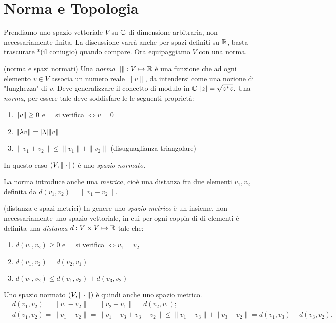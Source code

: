 \chapter{Norma e Topologia}
Prendiamo uno spazio vettoriale $V$ su $\mathbb C$ di dimensione arbitraria, non
necessariamente finita. La discussione varrà anche per spazi definiti su
$\mathbb R$, basta trascurare *(il coniugio) quando compare. Ora equipaggiamo $V$
con una norma.
\begin{definition}{(norma e spazi normati)}
Una \emph{norma} $\| \|: V \mapsto \mathbb R$ è una funzione che ad ogni elemento
$v \in V$ associa un numero reale $\|v\|$, da intendersi come una nozione di
"lunghezza" di $v$. Deve generalizzare il concetto di modulo in $\mathbb C$ 
${\left|z\right|} = \sqrt{z^* z}$. Una \emph{norma}, per essere tale deve soddisfare le
le seguenti proprietà:
\begin{enumerate}[1)]
	\item ${\|v\|} \geq 0$ e = si verifica $\iff v = 0$
	\item ${\|\lambda v\|} = {\left|\lambda\right|} {\|v\|}$
	\item $\|v_1 + v_2\| \leq \|v_1\| + \|v_2\|$ (disuguaglianza triangolare)
\end{enumerate}
In questo caso $\left(V, {\|\cdot\|} \right)$ è uno \emph{spazio normato}.
\end{definition}
La norma introduce anche una \emph{metrica}, cioè una distanza fra due elementi
$v_1, v_2$ definita da $d(v_1, v_2) = \|v_1 - v_2\|$. 
\begin{definition}{(distanza e spazi metrici)}
In genere uno \emph{spazio metrico} è un insieme, non necessariamente uno
spazio vettoriale, in cui per ogni coppia di di elementi è definita una
\emph{distanza} $d: V \times V \mapsto \mathbb R$ tale che:
\begin{enumerate}[1)]
	\item $d(v_1, v_2) \geq 0$ e = si verifica $\iff v_1 = v_2$
	\item $d(v_1, v_2) = d(v_2, v_1)$
	\item $d(v_1, v_2) \leq d(v_1, v_3) + d(v_3, v_2)$
\end{enumerate}
\end{definition}
Uno spazio normato $\left(V, {\|\cdot\|} \right)$ è quindi anche uno spazio metrico.
\begin{align*}
	&d(v_1, v_2) = \|v_1 - v_2\| = \|v_2 - v_1\| = d(v_2, v_1) ;\\ 
	&d(v_1, v_2) = \|v_1 - v_2\| = \|v_1 - v_3 +v_3 -v_2 \| \leq
	\|v_1 - v_3\| + \|v_3 - v_2\| = d(v_1, v_3) + d(v_3, v_2).
\end{align*}
